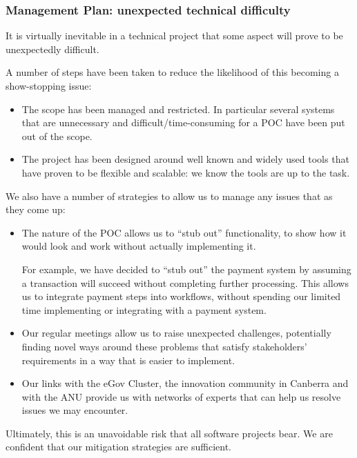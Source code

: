 \documentclass[12pt,a4paper,twosided]{article}
\begin{document}
\subsubsection{Management Plan: unexpected technical
difficulty}\label{management-plan-unexpected-technical-difficulty}

It is virtually inevitable in a technical project that some aspect will
prove to be unexpectedly difficult.

A number of steps have been taken to reduce the likelihood of this
becoming a show-stopping issue:

\begin{itemize}
\itemsep1pt\parskip0pt
\item
  The scope has been managed and restricted. In particular several
  systems that are unnecessary and difficult/time-consuming for a POC
  have been put out of the scope.
\item
  The project has been designed around well known and widely used tools
  that have proven to be flexible and scalable: we know the tools are up
  to the task.
\end{itemize}

We also have a number of strategies to allow us to manage any issues
that as they come up:

\begin{itemize}
\item
  The nature of the POC allows us to ``stub out'' functionality, to show
  how it would look and work without actually implementing it.

  For example, we have decided to ``stub out'' the payment system by
  assuming a transaction will succeed without completing further
  processing. This allows us to integrate payment steps into workflows,
  without spending our limited time implementing or integrating with a
  payment system.
\item
  Our regular meetings allow us to raise unexpected challenges,
  potentially finding novel ways around these problems that satisfy
  stakeholders' requirements in a way that is easier to implement.
\item
  Our links with the eGov Cluster, the innovation community in Canberra
  and with the ANU provide us with networks of experts that can help us
  resolve issues we may encounter.
\end{itemize}

Ultimately, this is an unavoidable risk that all software projects bear.
We are confident that our mitigation strategies are sufficient.
\end{document}
